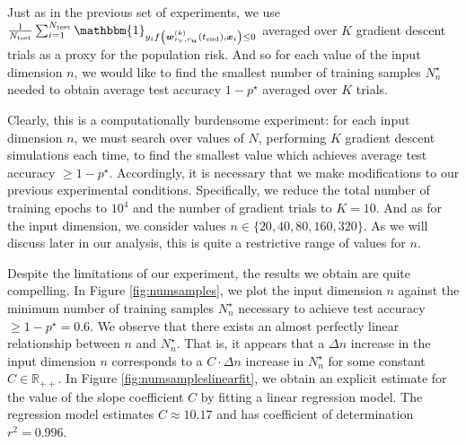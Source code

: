 \documentclass{article}
\begin{document}
Just as in the previous set of experiments, we use $\frac{1}{N_{\text{test}}} \sum_{i=1}^{N_{\text{test}}} \mathbbm{1}_{y_i f\left(\boldsymbol{w}_{r_v, r_{\boldsymbol{u}}}^{(k)}(t_{\text{end}}), \boldsymbol{x}_i\right) \leq 0}$ averaged over $K$ gradient descent trials as a proxy for the population risk. And so for each value of the input dimension $n$, we would like to find the smallest number of training samples $N_n^{\star}$ needed to obtain average test accuracy $1-p^{\star}$ averaged over $K$ trials.

Clearly, this is a computationally burdensome experiment: for each input dimension $n$, we must search over values of $N$, performing $K$ gradient descent simulations each time, to find the smallest value which achieves average test accuracy $\geq 1-p^{\star}$. Accordingly, it is necessary that we make modifications to our previous experimental conditions. Specifically, we reduce the total number of training epochs to $10^4$ and the number of gradient trials to $K = 10$. And as for the input dimension, we consider values $n \in \{20, 40, 80, 160, 320\}$. As we will discuss later in our analysis, this is quite a restrictive range of values for $n$.

Despite the limitations of our experiment, the results we obtain are quite compelling. In Figure \ref{fig:numsamples}, we plot the input dimension $n$ against the minimum number of training samples $N_n^{\star}$ necessary to achieve test accuracy $\geq 1-p^{\star} = 0.6$. We observe that there exists an almost perfectly linear relationship between $n$ and $N_n^{\star}$. That is, it appears that a $\Delta n$ increase in the input dimension $n$ corresponds to a $C \cdot \Delta n$ increase in $N_n^{\star}$ for some constant $C \in \mathbb{R}_{++}$. In Figure \ref{fig:numsampleslinearfit}, we obtain an explicit estimate for the value of the slope coefficient $C$ by fitting a linear regression model. The regression model estimates $C \approx 10.17$ and has coefficient of determination $r^2 = 0.996$.
\end{document}
